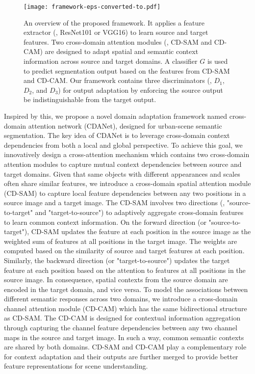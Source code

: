 \documentclass[10pt,twocolumn,letterpaper]{article}
\begin{document}
	\begin{figure*}
		\begin{center}
\texttt{[image: framework-eps-converted-to.pdf]}
		\end{center}
		\caption{An overview of the proposed framework. It applies a feature extractor (\ie, ResNet101 or VGG16) to learn source and target features. Two cross-domain attention modules (\ie, CD-SAM and CD-CAM) are designed to adapt spatial and semantic context information across source and target domains. A classifier $ G $ is used to predict segmentation output based on the features from CD-SAM and CD-CAM. Our framework contains three discriminators (\ie, $ D_1 $, $ D_2 $, and $ D_3 $) for output adaptation by enforcing the source output be indistinguishable from the target output.}
		\label{fig:framework}
		\vspace{-0.2in}
	\end{figure*}


	Inspired by this, we propose a novel domain adaptation framework named cross-domain attention network (CDANet), designed for urban-scene semantic segmentation. The key idea of CDANet is to leverage cross-domain context dependencies from both a local and global perspective. To achieve this goal, we innovatively design a cross-attention mechanism which contains two cross-domain attention modules to capture mutual context dependencies between source and target domains. Given that same objects with different appearances and scales often share similar features, we introduce a cross-domain spatial attention module (CD-SAM) to capture local feature dependencies between any two positions in a source image and a target image. The CD-SAM involves two directions (\ie, "source-to-target" and "target-to-source") to adaptively aggregate cross-domain features to learn common context information. On the forward direction (or "source-to-target"), CD-SAM updates the feature at each position in the source image as the weighted sum of features at all positions in the target image. The weights are computed based on the similarity of source and target features at each position. Similarly, the backward direction (or "target-to-source") updates the target feature at each position based on the attention to features at all positions in the source image. In consequence, spatial contexts from the source domain are encoded in the target domain, and vice versa. To model the associations between different semantic responses across two domains, we introduce a cross-domain channel attention module (CD-CAM) which has the same bidirectional structure as CD-SAM. The CD-CAM is designed for contextual information aggregation through capturing the channel feature dependencies between any two channel maps in the source and target image. In such a way, common semantic contexts are shared by both domains. CD-SAM and CD-CAM play a complementary role for context adaptation and their outputs are further merged to provide better feature representations for scene understanding.
\end{document}
